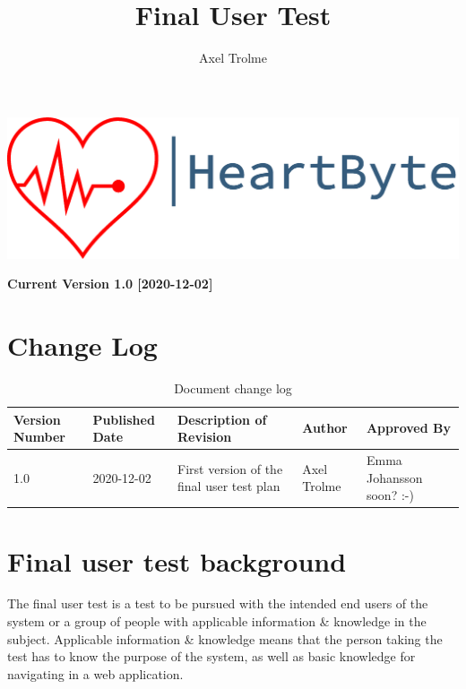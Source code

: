 \documentclass[12pt]{article}
\title{\Huge Final User Test}
\author{Axel Trolme}
\begin{document}
\maketitle
\vfill
\includegraphics[width=\linewidth]{Pictures/logo_heartbyte_transparent_v_1_1 (1)}

\vfill
\begin{center}
        \textbf{\large Current Version 1.0 [2020-12-02]}
\end{center}
\clearpage

\section{Change Log}
	
\begin{table}[H]

\begin{center}
\begin{tabular}{ | m{2cm} |m{2cm} |m{5cm}|m{4cm}|m{3cm}| } 
\hline
{Version Number} & {Published Date} & {Description of Revision}& {Author}& {Approved By} \\ 
\hline
1.0 & 2020-12-02 & First version of the final user test plan & Axel Trolme & Emma Johansson soon? :-)  \\
\hline
\end{tabular}
\end{center}
\caption{\label{tab:changeLog}Document change log}
\end{table}
\clearpage
\tableofcontents
\clearpage

    \section{Final user test background}
    The final user test is a test to be pursued with the intended end users of the system or a group of people with applicable information \& knowledge in the subject. Applicable information \& knowledge means that the person taking the test has to know the purpose of the system, as well as basic knowledge for navigating in a web application. \\ 
    
\end{document}
